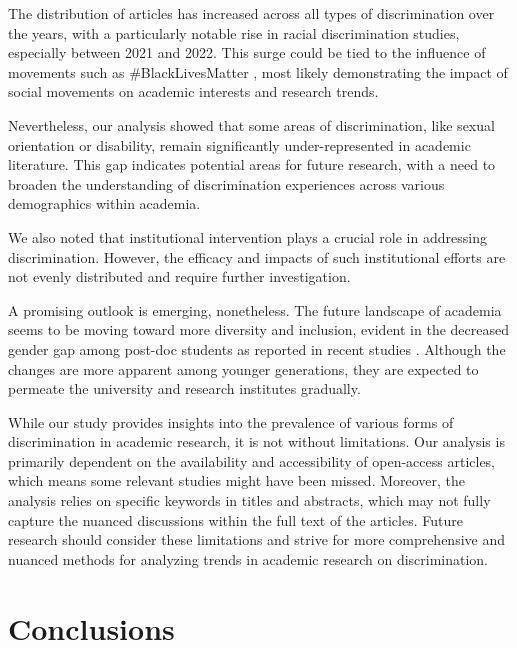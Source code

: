 \documentclass[runningheads]{llncs}
\begin{document}
The distribution of articles has increased across all types of discrimination over the years, with a particularly notable rise in racial discrimination studies, especially between 2021 and 2022. This surge could be tied to the influence of movements such as \#BlackLivesMatter \cite{nguyen2022black}, most likely demonstrating the impact of social movements on academic interests and research trends.

Nevertheless, our analysis showed that some areas of discrimination, like sexual orientation or disability, remain significantly under-represented in academic literature. This gap indicates potential areas for future research, with a need to broaden the understanding of discrimination experiences across various demographics within academia.

We also noted that institutional intervention plays a crucial role in addressing discrimination. However, the efficacy and impacts of such institutional efforts are not evenly distributed and require further investigation.

A promising outlook is emerging, nonetheless. The future landscape of academia seems to be moving toward more diversity and inclusion, evident in the decreased gender gap among post-doc students as reported in recent studies \cite{https://doi.org/10.1111/gwao.12549}. Although the changes are more apparent among younger generations, they are expected to permeate the university and research institutes gradually.

While our study provides insights into the prevalence of various forms of discrimination in academic research, it is not without limitations. Our analysis is primarily dependent on the availability and accessibility of open-access articles, which means some relevant studies might have been missed. Moreover, the analysis relies on specific keywords in titles and abstracts, which may not fully capture the nuanced discussions within the full text of the articles. Future research should consider these limitations and strive for more comprehensive and nuanced methods for analyzing trends in academic research on discrimination.

\section{Conclusions}
\end{document}
